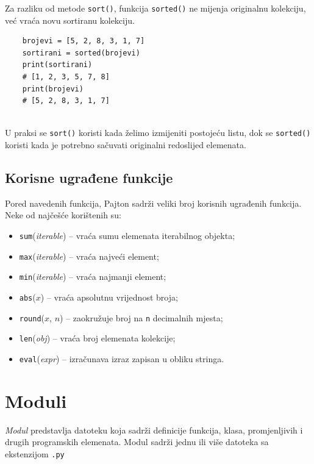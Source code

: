 
Za razliku od metode \texttt{sort()}, funkcija \texttt{sorted()} ne mijenja originalnu kolekciju, već vraća novu sortiranu kolekciju.

\begin{verbatim}
	brojevi = [5, 2, 8, 3, 1, 7]
	sortirani = sorted(brojevi)
	print(sortirani)
	# [1, 2, 3, 5, 7, 8]
	print(brojevi)
	# [5, 2, 8, 3, 1, 7]
	
\end{verbatim}

U praksi se \texttt{sort()} koristi kada želimo izmijeniti postojeću listu, dok se \texttt{sorted()} koristi kada je potrebno sačuvati originalni redoslijed elemenata.

\subsection{Korisne ugrađene funkcije}

Pored navedenih funkcija, Pajton sadrži veliki broj korisnih ugrađenih funkcija. Neke od najčešće korištenih su:

\begin{itemize}
	\item \texttt{sum}(\emph{iterable}) -- vraća sumu elemenata iterabilnog objekta;
	\item \texttt{max}(\emph{iterable}) -- vraća najveći element;
	\item \texttt{min}(\emph{iterable}) -- vraća najmanji element;
	\item \texttt{abs}($x$) -- vraća apsolutnu vrijednost broja;
	\item \texttt{round}($x$, $n$) -- zaokružuje broj na \texttt{n} decimalnih mjesta;
	\item \texttt{len}(\emph{obj}) -- vraća broj elemenata kolekcije;
	\item \texttt{eval}(\emph{expr}) -- izračunava izraz zapisan u obliku stringa.
\end{itemize}

\section{Moduli}

\textit{Modul} predstavlja datoteku koja sadrži definicije funkcija, klasa, promjenljivih i drugih programskih elemenata. Modul sadrži jednu ili više datoteka sa ekstenzijom \texttt{.py} %

